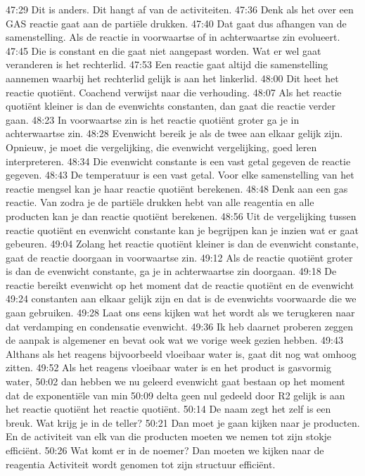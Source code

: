 47:29
Dit is anders. Dit hangt af van de activiteiten.
47:36
Denk als het over een GAS reactie gaat aan de partiële drukken.
47:40
Dat gaat dus afhangen van de samenstelling. Als de reactie in voorwaartse of in achterwaartse zin evolueert.
47:45
Die is constant en die gaat niet aangepast worden. Wat er wel gaat veranderen is het rechterlid.
47:53
Een reactie gaat altijd die samenstelling aannemen waarbij het rechterlid gelijk is aan het linkerlid.
48:00
Dit heet het reactie quotiënt. Coachend verwijst naar die verhouding.
48:07
Als het reactie quotiënt kleiner is dan de evenwichts constanten, dan gaat die reactie verder gaan.
48:23
In voorwaartse zin is het reactie quotiënt groter ga je in achterwaartse zin.
48:28
Evenwicht bereik je als de twee aan elkaar gelijk zijn. Opnieuw, je moet die vergelijking, die evenwicht vergelijking, goed leren interpreteren.
48:34
Die evenwicht constante is een vast getal gegeven de reactie gegeven.
48:43
De temperatuur is een vast getal. Voor elke samenstelling van het reactie mengsel kan je haar reactie quotiënt berekenen.
48:48
Denk aan een gas reactie. Van zodra je de partiële drukken hebt van alle reagentia en alle producten kan je dan reactie quotiënt berekenen.
48:56
Uit de vergelijking tussen reactie quotiënt en evenwicht constante kan je begrijpen kan je inzien wat er gaat gebeuren.
49:04
Zolang het reactie quotiënt kleiner is dan de evenwicht constante, gaat de reactie doorgaan in voorwaartse zin.
49:12
Als de reactie quotiënt groter is dan de evenwicht constante, ga je in achterwaartse zin doorgaan.
49:18
De reactie bereikt evenwicht op het moment dat de reactie quotiënt en de evenwicht
49:24
constanten aan elkaar gelijk zijn en dat is de evenwichts voorwaarde die we gaan gebruiken.
49:28
Laat ons eens kijken wat het wordt als we terugkeren naar dat verdamping en condensatie evenwicht.
49:36
Ik heb daarnet proberen zeggen de aanpak is algemener en bevat ook wat we vorige week gezien hebben.
49:43
Althans als het reagens bijvoorbeeld vloeibaar water is, gaat dit nog wat omhoog zitten.
49:52
Als het reagens vloeibaar water is en het product is gasvormig water,
50:02
dan hebben we nu geleerd evenwicht gaat bestaan op het moment dat de exponentiële van min
50:09
delta geen nul gedeeld door R2 gelijk is aan het reactie quotiënt het reactie quotiënt.
50:14
De naam zegt het zelf is een breuk. Wat krijg je in de teller?
50:21
Dan moet je gaan kijken naar je producten. En de activiteit van elk van die producten moeten we nemen tot zijn stokje efficiënt.
50:26
Wat komt er in de noemer? Dan moeten we kijken naar de reagentia Activiteit wordt genomen tot zijn structuur efficiënt.
